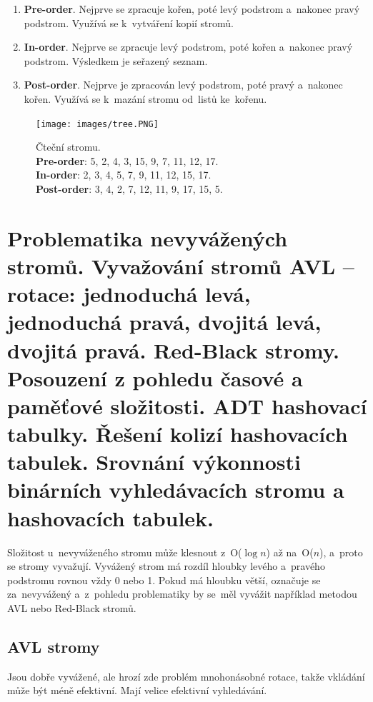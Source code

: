 \begin{enumerate}
	\item \textbf{Pre-order}. Nejprve se zpracuje kořen, poté levý podstrom a~nakonec pravý podstrom. Využívá se k~vytváření kopií stromů.
	\item \textbf{In-order}. Nejprve se zpracuje levý podstrom, poté kořen a~nakonec pravý podstrom. Výsledkem je seřazený seznam.
	\item \textbf{Post-order}. Nejprve je zpracován levý podstrom, poté pravý a~nakonec kořen. Využívá se k~mazání stromu od~listů ke~kořenu.
\end{enumerate}

\begin{figure}[ht]
	\centering
	\texttt{[image: images/tree.PNG]}
	\caption{
		Čteční stromu. \\
		\textbf{Pre-order}: 5, 2, 4, 3, 15, 9, 7, 11, 12, 17. \\
		\textbf{In-order}: 2, 3, 4, 5, 7, 9, 11, 12, 15, 17. \\
		\textbf{Post-order}: 3, 4, 2, 7, 12, 11, 9, 17, 15, 5. \\
	}
	\label{tree}
\end{figure}

\clearpage
\section[Problematika nevyvážených stromů. Vyvažování stromů AVL - rotace: jednoduchá levá, jednoduchá pravá, dvojitá levá, dvojitá pravá. Red-Black stromy]{Problematika nevyvážených stromů. Vyvažování stromů AVL -- rotace: jednoduchá levá, jednoduchá pravá, dvojitá levá, dvojitá pravá. Red-Black stromy. Posouzení z pohledu časové a paměťové složitosti. ADT hashovací tabulky. Řešení kolizí hashovacích tabulek. Srovnání výkonnosti binárních vyhledávacích stromu a hashovacích tabulek.
 }

Složitost u~nevyváženého stromu může klesnout z~O(\( \log{n} \)) až na~O(\( n \)), a~proto se stromy vyvažují. Vyvážený strom má rozdíl hloubky levého a~pravého podstromu rovnou vždy 0 nebo 1. Pokud má hloubku větší, označuje se za~nevyvážený a~z~pohledu problematiky by se~měl vyvážit například metodou AVL nebo Red-Black stromů.

\subsection{AVL stromy}

Jsou dobře vyvážené, ale hrozí zde problém mnohonásobné rotace, takže vkládání může být méně efektivní. Mají velice efektivní vyhledávání.

